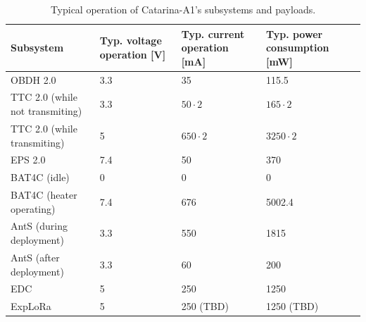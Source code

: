 \begin{table}[!ht]
    \centering
    \footnotesize
    \begin{tabular}{lM{2.3cm}M{2.5cm}M{2.5cm}}
        \toprule[1.5pt]
        \textbf{Subsystem} & \textbf{Typ. voltage operation [V]} & \textbf{Typ. current operation [mA]} & \textbf{Typ. power consumption [mW]}\\
        \midrule
        \ac{OBDH} 2.0                        & 3.3 & 35            & 115.5 \\
        \ac{TTC} 2.0 (while not transmiting) & 3.3 & $50 \cdot 2$  & $165 \cdot 2$ \\
        \ac{TTC} 2.0 (while transmiting)     & 5   & $650 \cdot 2$ & $3250 \cdot 2$ \\
        \ac{EPS} 2.0                         & 7.4 & 50            & 370 \\
        \acs{BAT4C} (idle)                   & 0   & 0             & 0 \\
        \acs{BAT4C} (heater operating)       & 7.4 & 676           & 5002.4 \\
        AntS (during deployment)             & 3.3 & 550           & 1815 \\
        AntS (after deployment)              & 3.3 & 60            & 200 \\
        \ac{EDC}                             & 5   & 250           & 1250 \\
        ExpLoRa                              & 5   & 250 (TBD)     & 1250 (TBD) \\
        \bottomrule[1.5pt]
    \end{tabular}
    \caption{Typical operation of Catarina-A1's subsystems and payloads.}
    \label{tab:power-requirements}
\end{table}

